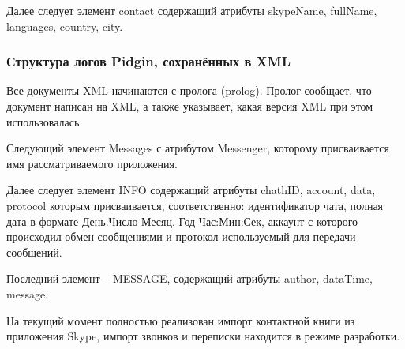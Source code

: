 Далее следует элемент contact содержащий атрибуты skypeName, fullName, languages, country, city.
  
\subsubsection{Структура логов Pidgin, сохранённых в XML}

Все документы XML начинаются с пролога (prolog). Пролог сообщает, что документ написан на XML, а также указывает, какая версия XML при этом использовалась.  

Следующий элемент Messages с атрибутом Messenger, которому присваивается имя рассматриваемого приложения.

Далее следует элемент INFO содержащий атрибуты chathID, account, data, protocol которым присваивается, соответственно: идентификатор чата, полная дата в формате День.Число Месяц. Год Час:Мин:Сек, аккаунт с которого происходил обмен сообщениями и протокол используемый для передачи сообщений. 

Последний элемент -- MESSAGE, содержащий атрибуты author, dataTime, message.

На текущий момент полностью реализован импорт контактной книги из приложения Skype, импорт звонков и переписки находится в режиме разработки.
